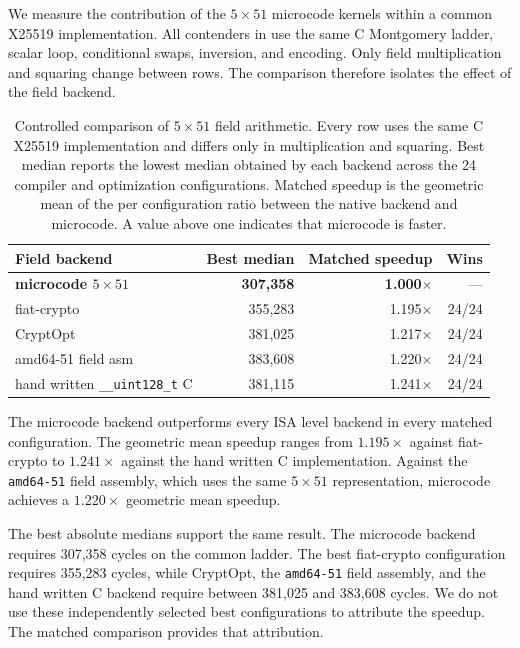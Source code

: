 \documentclass[journal=tches,submission]{iacrtrans}
\newcommand{\code}[1]{\texttt{#1}}
\begin{document}
We measure the contribution of the $5\times51$ microcode kernels within a common X25519 implementation.
All contenders in  use the same C Montgomery ladder, scalar loop, conditional swaps, inversion, and encoding.
Only field multiplication and squaring change between rows.
The comparison therefore isolates the effect of the field backend.

\begin{table}[htbp]
\centering
\caption{Controlled comparison of $5\times51$ field arithmetic.
Every row uses the same C X25519 implementation and differs only in multiplication and squaring.
Best median reports the lowest median obtained by each backend across the 24 compiler and optimization configurations.
Matched speedup is the geometric mean of the per configuration ratio between the native backend and microcode.
A value above one indicates that microcode is faster.}
\label{tab:res-c25519-field}
\footnotesize
\setlength{\tabcolsep}{4pt}
\begin{tabular}{@{}lrrr@{}}
\toprule
Field backend & Best median & Matched speedup & Wins \\
\midrule
\textbf{microcode $5\times51$} &
\textbf{307,358} &
\textbf{1.000$\times$} &
--- \\
\midrule
fiat-crypto &
355,283 &
1.195$\times$ &
24/24 \\
CryptOpt &
381,025 &
1.217$\times$ &
24/24 \\
amd64-51 field asm &
383,608 &
1.220$\times$ &
24/24 \\
hand written \code{\_\_uint128\_t} C &
381,115 &
1.241$\times$ &
24/24 \\
\bottomrule
\end{tabular}
\end{table}

The microcode backend outperforms every ISA level backend in every matched configuration.
The geometric mean speedup ranges from $1.195\times$ against fiat-crypto to $1.241\times$ against the hand written C implementation.
Against the \texttt{amd64-51} field assembly, which uses the same $5\times51$ representation, microcode achieves a $1.220\times$ geometric mean speedup.

The best absolute medians support the same result.
The microcode backend requires 307,358 cycles on the common ladder.
The best fiat-crypto configuration requires 355,283 cycles, while CryptOpt, the \texttt{amd64-51} field assembly, and the hand written C backend require between 381,025 and 383,608 cycles.
We do not use these independently selected best configurations to attribute the speedup.
The matched comparison provides that attribution.
\end{document}
